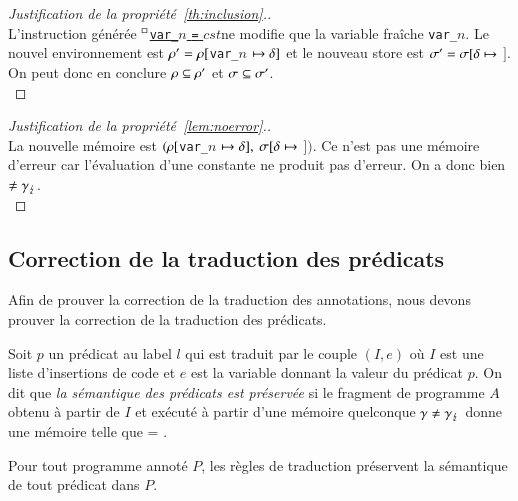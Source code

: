 \begin{proof}[Justification de la propriété~\ref{th:inclusion}.]~\\
  L'instruction générée
  ${^\square}$\underline{\lstinline'var_'$n$ \lstinline'=' $cst$}\semicolon ne
  modifie que la variable fraîche \lstinline'var_'$n$.
  Le nouvel environnement est
  $\rho' = \rho[$\lstinline'var_'$n$ $\mapsto \delta]$
  et le nouveau store est
  $\sigma' = \sigma[\delta \mapsto$ $]$.
  On peut donc en conclure $\rho \subseteq \rho'$ et $\sigma \subseteq \sigma'$.
  ~\\
\end{proof}


\begin{proof}[Justification de la propriété~\ref{lem:noerror}.]~\\
  La nouvelle mémoire est
  $(\rho[$\lstinline'var_'$n$ $\mapsto \delta],$
  $\sigma[\delta \mapsto$ $])$.
  Ce n'est pas une mémoire d'erreur car l'évaluation d'une constante ne produit
  pas d'erreur.
  On a donc bien
   $\neq \gamma_\lightning$.
  ~\\
\end{proof}


\subsection{Correction de la traduction des prédicats}
\label{sec:predicate-translation}


Afin de prouver la correction de la traduction des annotations,
nous devons prouver la correction de la traduction des prédicats.

\begin{definition}
  \label{def:pred-correct}
  Soit $p$ un prédicat au label $l$ qui est traduit par le couple $(I, e)$ où
  $I$ est une liste d'insertions de code et $e$ est la variable donnant la
  valeur du prédicat $p$.
  On dit que \emph{la sémantique des prédicats est préservée} si le fragment de
  programme $A$ obtenu à partir de $I$ et exécuté à partir d'une mémoire
  quelconque $\gamma \neq \gamma_\lightning$ donne une mémoire  telle
  que  = .
\end{definition}

\begin{myproperty}
  \label{lem:pred-correct}
  Pour tout programme annoté $P$, les règles de traduction préservent la
  sémantique de tout prédicat \eacsl dans $P$.
\end{myproperty}

